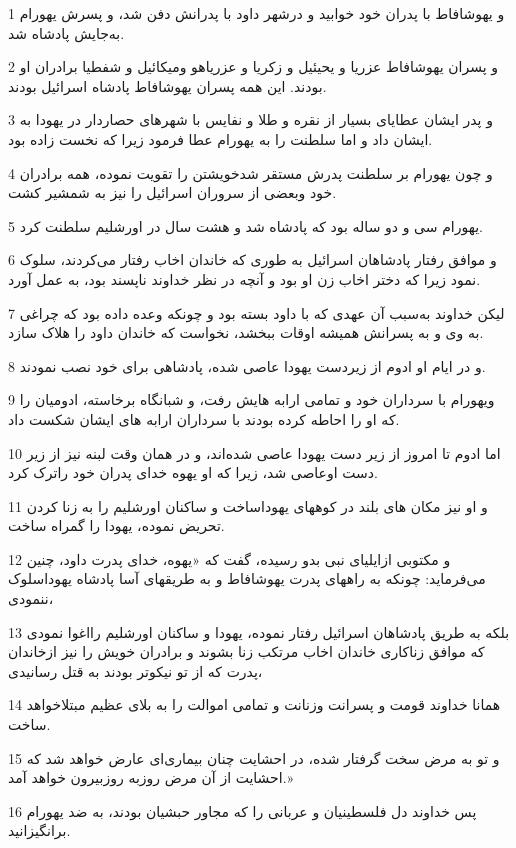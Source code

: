 \par 1 و یهوشافاط با پدران خود خوابید و درشهر داود با پدرانش دفن شد، و پسرش یهورام به‌جایش پادشاه شد.
\par 2 و پسران یهوشافاط عزریا و یحیئیل و زکریا و عزریاهو ومیکائیل و شفطیا برادران او بودند. این همه پسران یهوشافاط پادشاه اسرائیل بودند.
\par 3 و پدر ایشان عطایای بسیار از نقره و طلا و نفایس با شهرهای حصاردار در یهودا به ایشان داد و اما سلطنت را به یهورام عطا فرمود زیرا که نخست زاده بود. 
\par 4 و چون یهورام بر سلطنت پدرش مستقر شدخویشتن را تقویت نموده، همه برادران خود وبعضی از سروران اسرائیل را نیز به شمشیر کشت.
\par 5 یهورام سی و دو ساله بود که پادشاه شد و هشت سال در اورشلیم سلطنت کرد.
\par 6 و موافق رفتار پادشاهان اسرائیل به طوری که خاندان اخاب رفتار می‌کردند، سلوک نمود زیرا که دختر اخاب زن او بود و آنچه در نظر خداوند ناپسند بود، به عمل آورد.
\par 7 لیکن خداوند به‌سبب آن عهدی که با داود بسته بود و چونکه وعده داده بود که چراغی به وی و به پسرانش همیشه اوقات ببخشد، نخواست که خاندان داود را هلاک سازد.
\par 8 و در ایام او ادوم از زیردست یهودا عاصی شده، پادشاهی برای خود نصب نمودند.
\par 9 ویهورام با سرداران خود و تمامی ارابه هایش رفت، و شبانگاه برخاسته، ادومیان را که او را احاطه کرده بودند با سرداران ارابه های ایشان شکست داد.
\par 10 اما ادوم تا امروز از زیر دست یهودا عاصی شده‌اند، و در همان وقت لبنه نیز از زیر دست اوعاصی شد، زیرا که او یهوه خدای پدران خود راترک کرد.
\par 11 و او نیز مکان های بلند در کوههای یهوداساخت و ساکنان اورشلیم را به زنا کردن تحریض نموده، یهودا را گمراه ساخت.
\par 12 و مکتوبی ازایلیای نبی بدو رسیده، گفت که «یهوه، خدای پدرت داود، چنین می‌فرماید: چونکه به راههای پدرت یهوشافاط و به طریقهای آسا پادشاه یهوداسلوک ننمودی،
\par 13 بلکه به طریق پادشاهان اسرائیل رفتار نموده، یهودا و ساکنان اورشلیم رااغوا نمودی که موافق زناکاری خاندان اخاب مرتکب زنا بشوند و برادران خویش را نیز ازخاندان پدرت که از تو نیکوتر بودند به قتل رسانیدی،
\par 14 همانا خداوند قومت و پسرانت وزنانت و تمامی اموالت را به بلای عظیم مبتلاخواهد ساخت.
\par 15 و تو به مرض سخت گرفتار شده، در احشایت چنان بیماری‌ای عارض خواهد شد که احشایت از آن مرض روزبه روزبیرون خواهد آمد.»
\par 16 پس خداوند دل فلسطینیان و عربانی را که مجاور حبشیان بودند، به ضد یهورام برانگیزانید.
